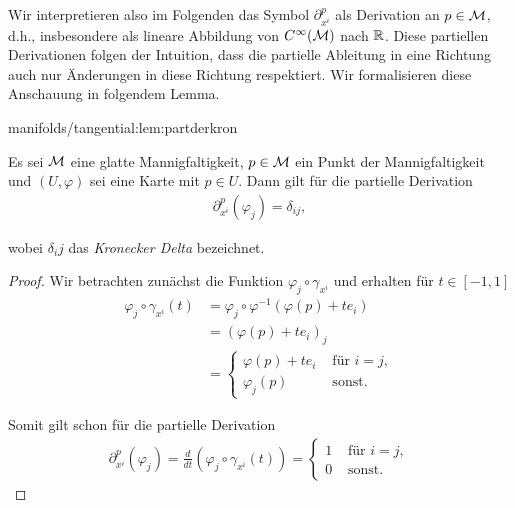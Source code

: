 \par
Wir interpretieren also im Folgenden das Symbol \(\partial_{x^{i}}^p\) als Derivation an \(p\in\mathcal{M}\), d.h., insbesondere als lineare Abbildung von \(C^\infty(\mathcal{M})\) nach \(\mathbb{R}\).
Diese partiellen Derivationen folgen der Intuition, dass die partielle Ableitung in eine Richtung auch nur Änderungen in diese Richtung respektiert.
Wir formalisieren diese Anschauung in folgendem Lemma.
\begin{lemma}{}{manifolds/tangential:lem:partderkron}



\par
Es sei \(\mathcal{M}\) eine glatte Mannigfaltigkeit, \(p\in\mathcal{M}\) ein Punkt der Mannigfaltigkeit und \((U,\varphi)\) sei eine Karte mit \(p\in U\).
Dann gilt für die partielle Derivation
\begin{align*}
\partial_{x^i}^p(\varphi_j) = \delta_{ij},
\end{align*}
\par
wobei \(\delta_ij\) das \emph{Kronecker Delta} bezeichnet.
\end{lemma}

\begin{proof}
 Wir betrachten zunächst die Funktion \(\varphi_j \circ \gamma_{x^i}\) und erhalten für \(t\in [-1,1]\)
\begin{align*}
\varphi_j \circ \gamma_{x^i}(t)
&= \varphi_j \circ \varphi^{-1}(\varphi(p) + t e_i)\\
&= (\varphi(p) + t e_i)_j\\ 
&=
\begin{cases}
\varphi(p) + t e_i &\text{ für } i=j,\\
\varphi_j(p)&\text{ sonst}.
\end{cases}
\end{align*}
\par
Somit gilt schon für die partielle Derivation
\begin{align*}
\partial_{x^i}^p(\varphi_j)=
\frac{d}{dt} (\varphi_j \circ \gamma_{x^i}(t)) = 
\begin{cases}
1&\text{ für } i=j,\\
0&\text{ sonst}.
\end{cases}
\end{align*}\end{proof}

